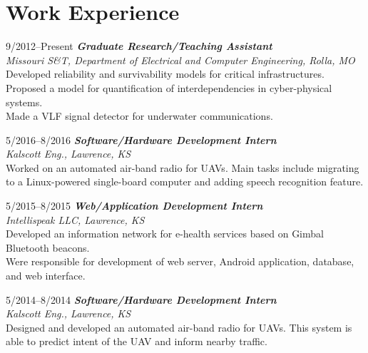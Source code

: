 \documentclass[10pt]{article}
\newlength{\Vspace}
\newlength{\Vspace}
\begin{document}
\section{Work Experience}

\begin{CV}

\item[9/2012--Present] \textbf{\textit{Graduate Research/Teaching Assistant}} \\
    \textit{Missouri S\&T, Department of Electrical and Computer Engineering, Rolla, MO}\vspace{\Vspace} \\
    Developed reliability and survivability models for critical infrastructures. \\
    Proposed a model for quantification of interdependencies in cyber-physical systems. \\
    Made a VLF signal detector for underwater communications.

\item[5/2016--8/2016] \textbf{\textit{Software/Hardware Development Intern}} \\
    \textit{Kalscott Eng., Lawrence, KS}\vspace{\Vspace} \\
    Worked on an automated air-band radio for UAVs. Main tasks include migrating to a Linux-powered single-board computer and adding speech recognition feature.

\item[5/2015--8/2015] \textbf{\textit{Web/Application Development Intern}} \\
    \textit{Intellispeak LLC, Lawrence, KS}\vspace{\Vspace} \\
    Developed an information network for e-health services based on Gimbal Bluetooth beacons. \\
    Were responsible for development of web server, Android application, database, and web interface.

\item[5/2014--8/2014] \textbf{\textit{Software/Hardware Development Intern}} \\
    \textit{Kalscott Eng., Lawrence, KS}\vspace{\Vspace} \\
    Designed and developed an automated air-band radio for UAVs. This system is able to predict intent of the UAV and inform nearby traffic.


\end{CV}
\end{document}
